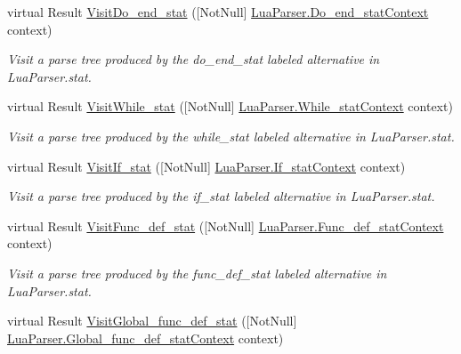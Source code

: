 \begin{DoxyCompactItemize}
virtual Result \mbox{\hyperlink{classzlua_1_1_lua_base_visitor_aa97f734c7ba79e7b5ccde1506774e0ec}{Visit\+Do\+\_\+end\+\_\+stat}} (\mbox{[}Not\+Null\mbox{]} \mbox{\hyperlink{classzlua_1_1_lua_parser_1_1_do__end__stat_context}{Lua\+Parser.\+Do\+\_\+end\+\_\+stat\+Context}} context)
\begin{DoxyCompactList}\small\item\em Visit a parse tree produced by the {\ttfamily do\+\_\+end\+\_\+stat} labeled alternative in Lua\+Parser.\+stat. \end{DoxyCompactList}\item 
virtual Result \mbox{\hyperlink{classzlua_1_1_lua_base_visitor_af5b6f400f4f8c7b55507a798e2abef27}{Visit\+While\+\_\+stat}} (\mbox{[}Not\+Null\mbox{]} \mbox{\hyperlink{classzlua_1_1_lua_parser_1_1_while__stat_context}{Lua\+Parser.\+While\+\_\+stat\+Context}} context)
\begin{DoxyCompactList}\small\item\em Visit a parse tree produced by the {\ttfamily while\+\_\+stat} labeled alternative in Lua\+Parser.\+stat. \end{DoxyCompactList}\item 
virtual Result \mbox{\hyperlink{classzlua_1_1_lua_base_visitor_a1e7d3f1f74effce653280aaffa193128}{Visit\+If\+\_\+stat}} (\mbox{[}Not\+Null\mbox{]} \mbox{\hyperlink{classzlua_1_1_lua_parser_1_1_if__stat_context}{Lua\+Parser.\+If\+\_\+stat\+Context}} context)
\begin{DoxyCompactList}\small\item\em Visit a parse tree produced by the {\ttfamily if\+\_\+stat} labeled alternative in Lua\+Parser.\+stat. \end{DoxyCompactList}\item 
virtual Result \mbox{\hyperlink{classzlua_1_1_lua_base_visitor_ac9505bda82c85093117ee5931e73f59c}{Visit\+Func\+\_\+def\+\_\+stat}} (\mbox{[}Not\+Null\mbox{]} \mbox{\hyperlink{classzlua_1_1_lua_parser_1_1_func__def__stat_context}{Lua\+Parser.\+Func\+\_\+def\+\_\+stat\+Context}} context)
\begin{DoxyCompactList}\small\item\em Visit a parse tree produced by the {\ttfamily func\+\_\+def\+\_\+stat} labeled alternative in Lua\+Parser.\+stat. \end{DoxyCompactList}\item 
virtual Result \mbox{\hyperlink{classzlua_1_1_lua_base_visitor_a24c128425bc45cc59eea8e463fead320}{Visit\+Global\+\_\+func\+\_\+def\+\_\+stat}} (\mbox{[}Not\+Null\mbox{]} \mbox{\hyperlink{classzlua_1_1_lua_parser_1_1_global__func__def__stat_context}{Lua\+Parser.\+Global\+\_\+func\+\_\+def\+\_\+stat\+Context}} context)

\end{DoxyCompactItemize}
